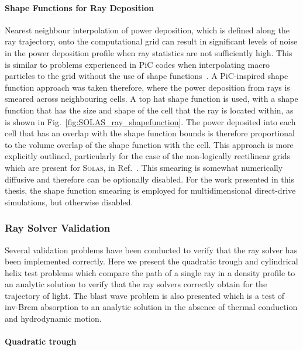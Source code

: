 \paragraph*{Shape Functions for Ray Deposition}
Nearest neighbour interpolation of power deposition, which is defined along the ray trajectory, onto the computational grid can result in significant levels of noise in the power deposition profile when ray statistics are not sufficiently high.
This is similar to problems experienced in \ac{PiC} codes when interpolating macro particles to the grid without the use of shape functions~\cite{birdsall_plasma_1985,arber_contemporary_2015}.
A \ac{PiC}-inspired shape function approach was taken therefore, where the power deposition from rays is smeared across neighbouring cells.
A top hat shape function is used, with a shape function that has the size and shape of the cell that the ray is located within, as is shown in Fig.~\ref{fig:SOLAS_ray_shapefunction}.
The power deposited into each cell that has an overlap with the shape function bounds is therefore proportional to the volume overlap of the shape function with the cell.
This approach is more explicitly outlined, particularly for the case of the non-logically rectilinear grids which are present for \textsc{Solas}, in Ref.~\cite{cornet_new_2007}.
This smearing is somewhat numerically diffusive and therefore can be optionally disabled.
For the work presented in this thesis, the shape function smearing is employed for multidimensional direct-drive simulations, but otherwise disabled.

\subsubsection{Ray Solver Validation}%
\label{sec:SOLAS_ray_validation}

Several validation problems have been conducted to verify that the ray solver has been implemented correctly.
Here we present the quadratic trough and cylindrical helix test problems which compare the path of a single ray in a density profile to an analytic solution to verify that the ray solvers correctly obtain for the trajectory of light.
The blast wave problem is also presented which is a test of \ac{inv-Brem} absorption to an analytic solution in the absence of thermal conduction and hydrodynamic motion.

\paragraph*{Quadratic trough}

